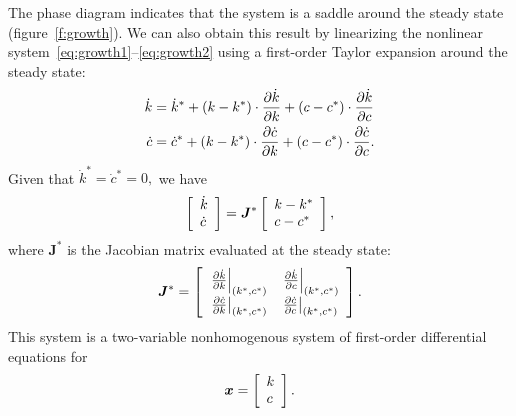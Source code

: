 \documentclass[letterpaper,12pt,leqno]{article}
\begin{document}
The phase diagram indicates that the system is a saddle around the steady state (figure~\ref{f:growth}). We can also obtain this result by linearizing the nonlinear system~\eqref{eq:growth1}--\eqref{eq:growth2} using a first-order Taylor expansion around the steady state:
\begin{align*}
\dot{k} &=\dot{k}^{*} +\left( k-k^{*} \right) \cdot \frac{\partial \dot{k}}{\partial k}+\left( c-c^{*} \right)\cdot \frac{\partial \dot{k}}{\partial c} \\
\dot{c} &=\dot{c}^{*} +\left( k-k^{*} \right)\cdot  \frac{\partial \dot{c}}{\partial k}+\left( c-c^{*} \right)\cdot \frac{\partial \dot{c}}{\partial c}.
\end{align*}
Given that $\dot{k}^{*} =\dot{c}^{*} =0,$ we have 
\begin{equation*}
\left[ \begin{array}{l}
\dot{k}\\ 
\dot{c}
\end{array} \right] =\bm{J}^{*}\left[ 
\begin{array}{l}
k-k^{*} \\ 
c-c^{*}
\end{array} \right],
\end{equation*}
where $\bm{J}^{*}$ is the Jacobian matrix evaluated at the steady state:
\begin{equation*}
\bm{J}^{*}=\left[ 
\begin{array}{ll}
\left.\frac{\partial \dot{k}}{\partial k}\right\vert_{(k^{*},c^{*})}  & \left.\frac{\partial \dot{k}}{\partial c}\right\vert_{(k^{*},c^{*})} \\ 
\left.\frac{\partial \dot{c}}{\partial k}\right\vert_{(k^{*},c^{*})} & \left.\frac{\partial \dot{c}}{\partial c}\right\vert_{(k^{*},c^{*})}
\end{array} \right].
\end{equation*}
This system is a two-variable nonhomogenous system of first-order differential equations
for \[\bm{x}=\left[ \begin{array}{l}
k\\ 
c
\end{array} \right].\]
\end{document}
